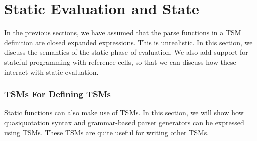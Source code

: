 \chapter{Static Evaluation and State}
In the previous sections, we have assumed that the parse functions in a TSM definition are closed expanded expressions. This is unrealistic. In this section, we discuss the semantics of the static phase of evaluation. We also add support for stateful programming with reference cells, so that we can discuss how these interact with static evaluation.

\subsection{TSMs For Defining TSMs}\label{sec:tsms-for-tsms}
Static functions can also make use of TSMs. In this section, we will show how quasiquotation syntax and grammar-based parser generators can be expressed using TSMs. These TSMs are quite useful for writing other TSMs.
